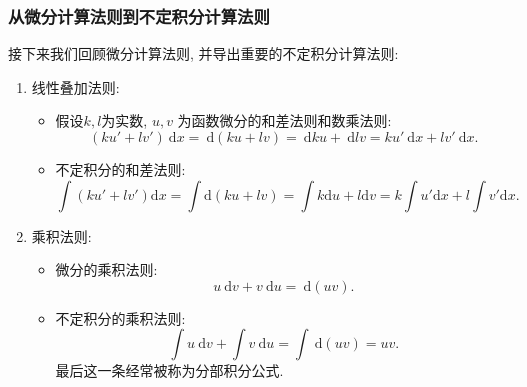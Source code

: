 \documentclass[
10pt,
aspectratio=43,
]{beamer}
\begin{document}
\begin{frame}
	\frametitle{从微分计算法则到不定积分计算法则}
	接下来我们回顾微分计算法则, 并导出重要的不定积分计算法则:\pause
	\begin{block}{}
		\begin{enumerate}
			\item 线性叠加法则:
			      \begin{itemize}
				      \item \pause 假设$k, l$为实数, $u, v$ 为函数微分的和差法则和数乘法则:
				            $$
					            (ku'+lv')\mathrm{~d}x=\mathrm{~d}(ku+ lv) = \mathrm{~d}ku + \mathrm{~d}lv=ku'\mathrm{~d}x+lv'\mathrm{~d}x.
				            $$
				      \item \pause 不定积分的和差法则:
				            $$
					            \int(ku'+lv')\mathrm{d}x=\int\mathrm{d}(ku+ lv) = \int k\mathrm{d}u + l\mathrm{d}v=k\int u'\mathrm{d}x+l\int v'\mathrm{d}x.
				            $$
			      \end{itemize}
			      \pause
			\item 乘积法则:
			      \begin{itemize}
				      \item \pause 微分的乘积法则:
				            $$
					            u\mathrm{~d}v+v\mathrm{~d}u =\mathrm{~d}(uv).
				            $$
				      \item \pause 不定积分的乘积法则:
				            $$
					            \int u\mathrm{~d}v+\int v\mathrm{~d}u=\int\mathrm{~d}(uv) = uv.
				            $$
				            \pause 最后这一条经常被称为分部积分公式.
			      \end{itemize}
		\end{enumerate}
	\end{block}
\end{frame}
\end{document}
